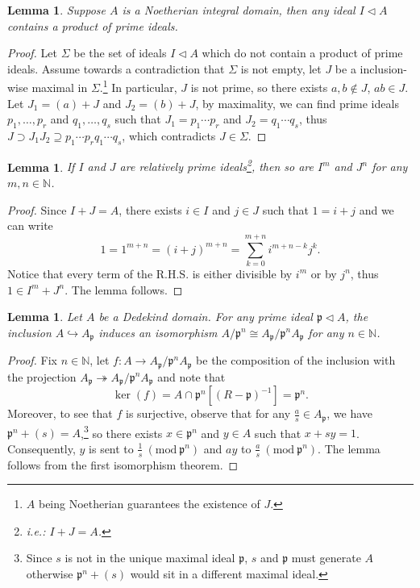 \documentclass{tufte-handout} %
\newtheorem{lem}[thm]{Lemma}
\theoremstyle{definition}
\theoremstyle{remark}
\newcommand{\Mod}[1]{\ (\text{mod}\ #1)}
\newcommand{\N}{\mathbb{N}}
\newcommand{\lp}{{\mathfrak{p}}}
\begin{document}
\begin{lem}\label{containprod}
	Suppose $A$ is a Noetherian integral domain, then any ideal $I\lhd A$ contains a product of prime ideals.
\end{lem}
\begin{proof}
	Let $\Sigma$ be the set of ideals $I \lhd A$ which do not contain a product of prime ideals. Assume towards a contradiction that $\Sigma$ is not empty, let $J$ be a inclusion-wise maximal in $\Sigma$.\footnote{$A$ being Noetherian guarantees the existence of $J$.} In particular, $J$ is not prime, so there exists $a,b \notin J$, $ab \in J$. Let $J_1 = (a) + J$ and $J_2 = (b) + J$, by maximality, we can find prime ideals $p_1, \dots, p_r$ and $q_1, \dots, q_s$ such that $J_1 = p_1\cdots p_r$ and $J_2 = q_1\cdots q_s$, thus $J \supset J_1J_2 \supseteq p_1\cdots p_rq_1\cdots q_s$, which contradicts $J \in \Sigma$.
\end{proof}
\begin{lem}\label{coprimepowers}
	If $I$ and $J$ are relatively prime ideals\footnote{i.e.: $I+J = A$.}, then so are $I^m$ and $J^n$ for any $m,n \in \N$.
\end{lem}
\begin{proof}
	Since $I + J = A$, there exists $i \in I$ and $j \in J$ such that $1 = i+j$ and we can write
	\[1 = 1^{m+n} = (i+j)^{m+n} = \sum_{k=0}^{m+n}i^{m+n-k}j^k.\]
	Notice that every term of the R.H.S. is either divisible by $i^m$ or by $j^n$, thus $1 \in I^m+J^n$. The lemma follows.
\end{proof}
\begin{lem}\label{moddinginlocal}
	Let $A$ be a Dedekind domain. For any prime ideal $\lp \lhd A$, the inclusion $A \hookrightarrow A_{\lp}$ induces an isomorphism $A/\lp^n \cong A_{\lp}/\lp^nA_{\lp}$ for any $n \in \N$.
\end{lem}
\begin{proof}
	Fix $n \in \N$, let $f: A\rightarrow A_{\lp}/\lp^nA_{\lp}$ be the composition of the inclusion with the projection $A_{\lp} \twoheadrightarrow A_{\lp}/\lp^nA_{\lp}$ and note that \[\ker(f) = A \cap \lp^n[(R-\lp)^{-1}] = \lp^n.\] Moreover, to see that $f$ is surjective, observe that for any $\frac{a}{s} \in A_{\lp}$, we have $\lp^n + (s) = A$,\footnote{Since $s$ is not in the unique maximal ideal $\lp$, $s$ and $\lp$ must generate $A$ otherwise $\lp^n + (s)$ would sit in a different maximal ideal.} so there exists $x \in \lp^n$ and $y \in A$ such that $x+sy = 1$. Consequently, $y$ is sent to $\frac{1}{s} \Mod{\lp^n}$ and $ay$ to $\frac{a}{s} \Mod{\lp^n}$. The lemma follows from the first isomorphism theorem.
\end{proof}
\end{document}
